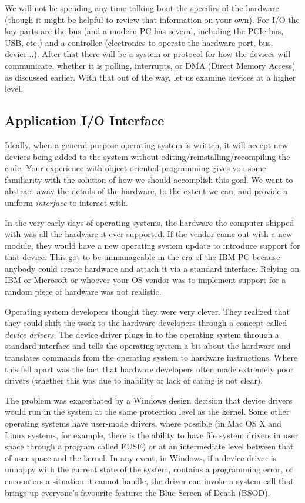 We will not be spending any time talking bout the specifics of the hardware (though it might be helpful to review that information on your own). For I/O the key parts are the bus (and a modern PC has several, including the PCIe bus, USB, etc.) and a controller (electronics to operate the hardware port, bus, device...). After that there will be a system or protocol for how the devices will communicate, whether it is polling, interrupts, or DMA (Direct Memory Access) as discussed earlier. With that out of the way, let us examine devices at a higher level.

\subsection*{Application I/O Interface}

Ideally, when a general-purpose operating system is written, it will accept new devices being added to the system without editing/reinstalling/recompiling the code. Your experience with object oriented programming gives you some familiarity with the solution of how we should accomplish this goal. We want to abstract away the details of the hardware, to the extent we can, and provide a uniform \textit{interface} to interact with. 

In the very early days of operating systems, the hardware the computer shipped with was all the hardware it ever supported. If the vendor came out with a new module, they would have a new operating system update to introduce support for that device. This got to be unmanageable in the era of the IBM PC because anybody could create hardware and attach it via a standard interface. Relying on IBM or Microsoft or whoever your OS vendor was to implement support for a random piece of hardware was not realistic.

Operating system developers thought they were very clever. They realized that they could shift the work to the hardware developers through a concept called \textit{device drivers}. The device driver plugs in to the operating system through a standard interface and tells the operating system a bit about the hardware and translates commands from the operating system to hardware instructions. Where this fell apart was the fact that hardware developers often made extremely poor drivers (whether this was due to inability or lack of caring is not clear).

The problem was exacerbated by a Windows design decision that device drivers would run in the system at the same protection level as the kernel. Some other operating systems have user-mode drivers, where possible (in Mac OS X and Linux systems, for example, there is the ability to have file system drivers in user space through a program called FUSE) or at an intermediate level between that of user space and the kernel. In any event, in Windows, if a device driver is unhappy with the current state of the system, contains a programming error, or encounters a situation it cannot handle, the driver can invoke a system call that brings up everyone's favourite feature: the Blue Screen of Death (BSOD).

